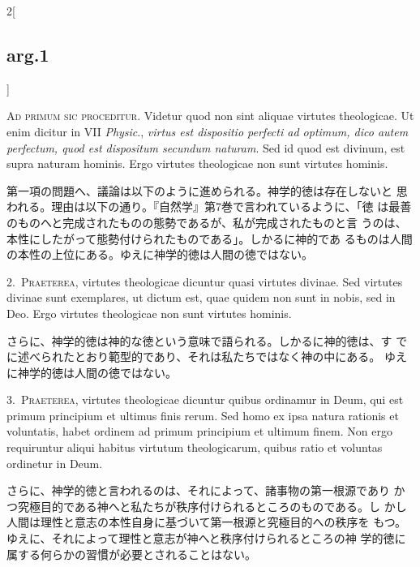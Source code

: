 \documentclass[paper=a4paper,fontsize=10pt,jafontsize=9pt,titlepage]{jlreq}
\begin{document}
\begin{paracol}{2}[\subsection{arg.1}]

{\scshape Ad primum sic proceditur}. Videtur quod non sint aliquae
virtutes theologicae. Ut enim dicitur in VII {\itshape Physic}.,
{\itshape virtus est dispositio perfecti ad optimum, dico autem
perfectum, quod est dispositum secundum naturam}. Sed id quod est
divinum, est supra naturam hominis. Ergo virtutes theologicae non sunt
virtutes hominis.

\switchcolumn

第一項の問題へ、議論は以下のように進められる。神学的徳は存在しないと
 思われる。理由は以下の通り。『自然学』第7巻で言われているように、「徳
 は最善のものへと完成されたものの態勢であるが、私が完成されたものと言
 うのは、本性にしたがって態勢付けられたものである」。しかるに神的であ
 るものは人間の本性の上位にある。ゆえに神学的徳は人間の徳ではない。


2.~{\scshape Praeterea}, virtutes theologicae dicuntur quasi virtutes
divinae. Sed virtutes divinae sunt exemplares, ut dictum est, quae
quidem non sunt in nobis, sed in Deo. Ergo virtutes theologicae non
sunt virtutes hominis.

\switchcolumn

さらに、神学的徳は神的な徳という意味で語られる。しかるに神的徳は、す
 でに述べられたとおり範型的であり、それは私たちではなく神の中にある。
 ゆえに神学的徳は人間の徳ではない。


3.~{\scshape Praeterea}, virtutes theologicae dicuntur quibus
ordinamur in Deum, qui est primum principium et ultimus finis
rerum. Sed homo ex ipsa natura rationis et voluntatis, habet ordinem
ad primum principium et ultimum finem. Non ergo requiruntur aliqui
habitus virtutum theologicarum, quibus ratio et voluntas ordinetur in
Deum.

\switchcolumn

さらに、神学的徳と言われるのは、それによって、諸事物の第一根源であり
 かつ究極目的である神へと私たちが秩序付けられるところのものである。し
 かし人間は理性と意志の本性自身に基づいて第一根源と究極目的への秩序を
 もつ。ゆえに、それによって理性と意志が神へと秩序付けられるところの神
 学的徳に属する何らかの習慣が必要とされることはない。


\end{paracol}
\end{document}
